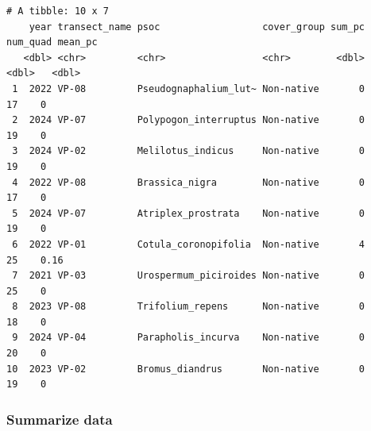 \documentclass[
  letterpaper,
  DIV=11,
  numbers=noendperiod]{scrartcl}
\begin{document}
\begin{verbatim}
# A tibble: 10 x 7
    year transect_name psoc                  cover_group sum_pc num_quad mean_pc
   <dbl> <chr>         <chr>                 <chr>        <dbl>    <dbl>   <dbl>
 1  2022 VP-08         Pseudognaphalium_lut~ Non-native       0       17    0   
 2  2024 VP-07         Polypogon_interruptus Non-native       0       19    0   
 3  2024 VP-02         Melilotus_indicus     Non-native       0       19    0   
 4  2022 VP-08         Brassica_nigra        Non-native       0       17    0   
 5  2024 VP-07         Atriplex_prostrata    Non-native       0       19    0   
 6  2022 VP-01         Cotula_coronopifolia  Non-native       4       25    0.16
 7  2021 VP-03         Urospermum_piciroides Non-native       0       25    0   
 8  2023 VP-08         Trifolium_repens      Non-native       0       18    0   
 9  2024 VP-04         Parapholis_incurva    Non-native       0       20    0   
10  2023 VP-02         Bromus_diandrus       Non-native       0       19    0   
\end{verbatim}

\subsubsection{Summarize data}\label{summarize-data}
\end{document}
